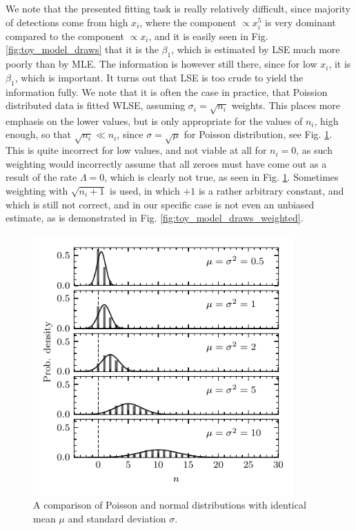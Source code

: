 We note that the presented fitting task is really relatively difficult, since majority of detections come from high $x_i$, where the component $\propto x_i^5$ is very dominant compared to the component $\propto x_i$, and it is easily seen in Fig. \ref{fig:toy_model_draws} that it is the $\beta_1$, which is estimated by LSE much more poorly than by MLE. The information is however still there, since for low $x_i$, it is $\beta_1$, which is important. It turns out that LSE is too crude to yield the information fully. We note that it is often the case in practice, that Poission distributed data is fitted WLSE, assuming $\sigma_i = \sqrt{n_i}$ weights. This places more emphasis on the lower values, but is only appropriate for the values of $n_i$, high enough, so that $\sqrt{n_i} \ll n_i$, since $\sigma = \sqrt{\mu}$ for Poisson distribution, see Fig. \ref{fig:pois_vs_norm}. This is quite incorrect for low values, and not viable at all for $n_i = 0$, as such weighting would incorrectly assume that all zeroes must have come out as a result of the rate $\Lambda = 0$, which is clearly not true, as seen in Fig. \ref{fig:pois_vs_norm}. Sometimes weighting with $\sqrt{n_i+1}$ is used, in which $+1$ is a rather arbitrary constant, and which is still not correct, and in our specific case is not even an unbiased estimate, as is demonstrated in Fig. \ref{fig:toy_model_draws_weighted}. 

\begin{figure}[h]
 	\centering
 	\includegraphics[width=10cm]{figures/pois_vs_norm.pdf}
 	\caption{A comparison of Poisson and normal distributions with identical mean $\mu$ and standard deviation $\sigma$.}
 	\label{fig:pois_vs_norm}
\end{figure}

